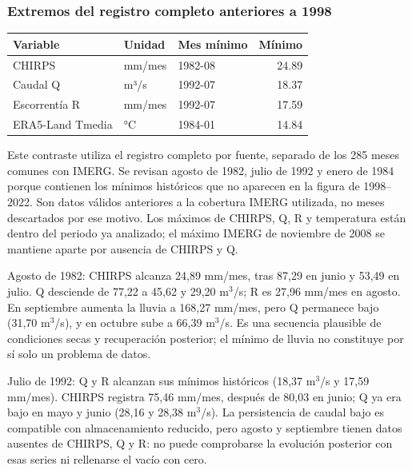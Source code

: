 \subsubsection*{Extremos del registro completo anteriores a 1998}
\begin{center}{\small
\begin{tabular}{lllr}
\toprule
Variable & Unidad & Mes mínimo & Mínimo \\
\midrule
CHIRPS & mm/mes & 1982-08 & 24.89 \\
Caudal Q & m³/s & 1992-07 & 18.37 \\
Escorrentía R & mm/mes & 1992-07 & 17.59 \\
ERA5-Land Tmedia & °C & 1984-01 & 14.84 \\
\bottomrule
\end{tabular}
}\end{center}
Este contraste utiliza el registro completo por fuente, separado de los 285 meses comunes con IMERG. Se revisan agosto de 1982, julio de 1992 y enero de 1984 porque contienen los mínimos históricos que no aparecen en la figura de 1998--2022. Son datos válidos anteriores a la cobertura IMERG utilizada, no meses descartados por ese motivo. Los máximos de CHIRPS, Q, R y temperatura están dentro del periodo ya analizado; el máximo IMERG de noviembre de 2008 se mantiene aparte por ausencia de CHIRPS y Q.

Agosto de 1982: CHIRPS alcanza 24,89 mm/mes, tras 87,29 en junio y 53,49 en julio. Q desciende de 77,22 a 45,62 y 29,20 m$^3$/s; R es 27,96 mm/mes en agosto. En septiembre aumenta la lluvia a 168,27 mm/mes, pero Q permanece bajo (31,70 m$^3$/s), y en octubre sube a 66,39 m$^3$/s. Es una secuencia plausible de condiciones secas y recuperación posterior; el mínimo de lluvia no constituye por sí solo un problema de datos.

Julio de 1992: Q y R alcanzan sus mínimos históricos (18,37 m$^3$/s y 17,59 mm/mes). CHIRPS registra 75,46 mm/mes, después de 80,03 en junio; Q ya era bajo en mayo y junio (28,16 y 28,38 m$^3$/s). La persistencia de caudal bajo es compatible con almacenamiento reducido, pero agosto y septiembre tienen datos ausentes de CHIRPS, Q y R: no puede comprobarse la evolución posterior con esas series ni rellenarse el vacío con cero.

